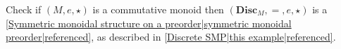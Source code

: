 
Check if $(M,e,\star)$ is a commutative monoid then $(\mathbf{Disc}_M, =, e, \star)$ is a \ref{Symmetric monoidal structure on a preorder|symmetric monoidal preorder|referenced}, as described in \ref{Discrete SMP|this example|referenced}.